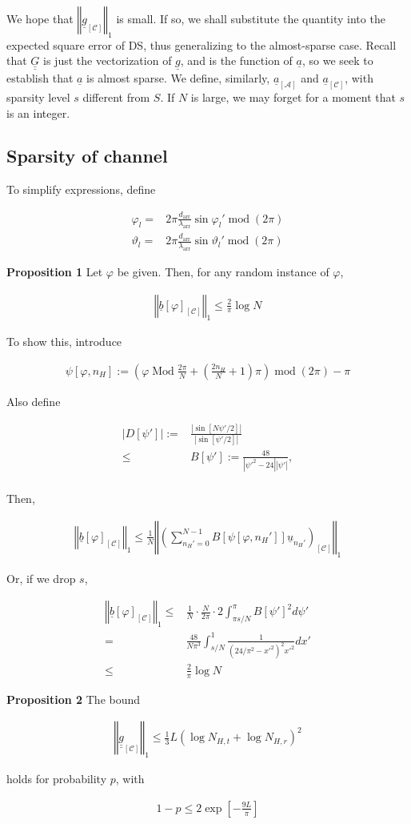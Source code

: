 \documentclass[journal]{IEEEtran}
\newcommand {\f} {\varphi}
\renewcommand {\l} {\lambda}
\renewcommand {\th} {\vartheta}
\newcommand {\D} {\cdot}
\newcommand {\m} [1] {\( #1 \)}
\newcommand {\V} [1] {\underline {#1}}
\newcommand {\M} [1] {\underline {\underline {#1}}}
\newcommand {\RB} [1] {\left( #1 \right)}
\newcommand {\SB} [1] {\left[ #1 \right]}
\newcommand {\Nm} [1] {\left \vert #1 \right \vert}
\newcommand {\VNm} [1] {\left \Vert #1 \right \Vert}
\newcommand {\Disp} [1] {
   \begin {align*}
      #1
   \end {align*}
}
\begin{document}
We hope that \m {\VNm {\V {g} _{\SB{\mathcal {C}}}} _1} is small.
If so, we shall substitute the quantity into the expected square error of DS, thus generalizing to the almost-sparse case.
Recall that \m {\M {G}} is just the vectorization of \m {\V {g}}, and is the function of \m {\V {a}}, so we seek to establish that \m {\V {a}} is almost sparse.
We define, similarly, \m {\V {a} _{\SB{\mathcal {A}}}} and \m {\V {a} _{\SB{\mathcal {C}}}}, with sparsity level \m {s} different from \m {S}.
If \m {N} is large, we may forget for a moment that \m {s} is an integer.

\subsection {Sparsity of channel}

To simplify expressions, define
%
\Disp {
\f_l
= &2\pi \frac {d_{\mathrm {arr}}} {\l_{\mathrm {arr}}} \sin \f_l'
  \; \mathrm {mod}\; \RB {2\pi} \\
%
\th_l
= &2\pi \frac {d_{\mathrm {arr}}} {\l_{\mathrm {arr}}} \sin \th_l'
  \; \mathrm {mod}\; \RB {2\pi} 
}

\textbf {Proposition 1}
Let \m {\f} be given.
Then, for any random instance of \m {\f},
%
\Disp {
\VNm {\V {b} \SB {\f} _{\SB{\mathcal {C}}}} _1
\leq \frac {2} {\pi} \log N 
}

To show this, introduce
\Disp {
\psi \SB {\f, n_H}
:=\RB {
   \f \; \mathrm {Mod}\; \frac {2\pi} {N}
   + \RB {\frac {2 n_H} {N} + 1} \pi
} \;
\mathrm {mod}\; \RB {2\pi}
- \pi 
}
Also define
\Disp {
\Nm {D \SB {\psi'}}
:= &\frac {\Nm {\sin \SB {N \psi'/2}}} {\Nm {\sin \SB {\psi' /2}}} \\
\leq &B \SB {\psi'}
:= \frac {48} {\Nm {\psi'^2 -24} \Nm {\psi'}}, \\
}
Then,
\Disp {
\VNm {\V {b} \SB {\f} _{\SB{\mathcal {C}}}} _1
\leq \frac {1} {N}
\VNm {
\RB {
   \sum_{n_H' =0}^{N -1}
      B \SB {\psi \SB {\f, n_H'}}
      \V {u} _{n_H'}
} _{\SB{\mathcal {C}}}
} _1
}
Or, if we drop \m {s},
\Disp {
\VNm {\V {b} \SB {\f} _{\SB{\mathcal {C}}}} _1
\leq &\frac {1} {N} \D \frac {N} {2\pi} \D 2 \int_{\pi s/N}^{\pi} B \SB {\psi'} ^2 d \psi' \\
= &\frac {48} {N \pi^3}
\int _{s /N} ^1 \frac {1} {\RB {24/\pi^2 -x'^2} ^2 x'^2} dx' \\
\leq &\frac {2} {\pi} \log N 
}


\textbf {Proposition 2}
The bound
%
\Disp {
\VNm {\M {g} _{\SB{\mathcal {C}}}} _1
\leq \frac {1} {3} L \RB {\log N_{H,t} + \log N_{H,r}} ^2
}
%
holds for probability \m {p}, with
%
\Disp {
1 -p
\leq 2 \exp \SB {- \frac {9L} {\pi}} 
}
\end{document}
